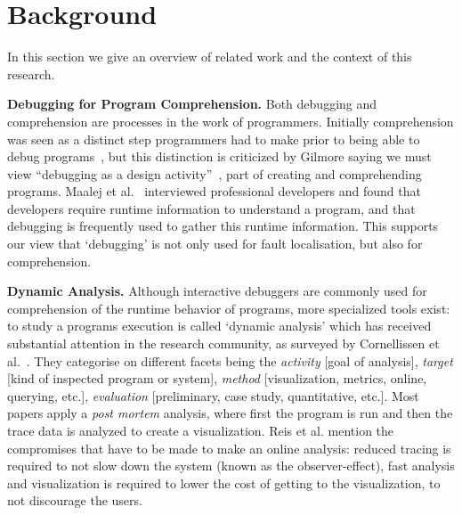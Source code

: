 \section{Background}
\label{background}
In this section we give an overview of related work 
and the context of this research.

\textbf{Debugging for Program Comprehension.}
Both debugging and comprehension are processes in the work of programmers.
Initially comprehension was seen as a distinct step programmers had to make
prior to being able to debug programs~\cite{katz1987debugging}, 
but this distinction is criticized by Gilmore saying we must view 
``debugging as a design activity''~\cite{gilmore1991models}, 
part of creating and comprehending programs. 
Maalej et al.~\cite{Maalej2014} interviewed professional developers 
and found that developers require runtime information to understand a program,
and that debugging is frequently used to gather this runtime information.
This supports our view that `debugging' is not only used for fault localisation,
but also for comprehension.


\textbf{Dynamic Analysis.}
Although interactive debuggers are commonly used for comprehension 
of the runtime behavior of programs, more specialized tools exist: 
to study a programs execution is called `dynamic analysis' which has 
received substantial attention in the research community,
as surveyed by Cornellissen et al.~\cite{cornelissen2009systematic}.
They categorise on different facets being the 
\textit{activity} [goal of analysis],
\textit{target} [kind of inspected program or system],
\textit{method} [visualization, metrics, online, querying, etc.],
\textit{evaluation} [preliminary, case study, quantitative, etc.].
Most papers apply a \textit{post mortem} analysis, where first the program is run and then the trace data is analyzed to create a visualization.
Reis et al. mention the compromises
that have to be made to make an online analysis: 
reduced tracing is required to not slow down the 
system (known as the observer-effect), fast analysis 
and visualization is required to lower the cost of getting 
to the visualization, to not discourage the users.

